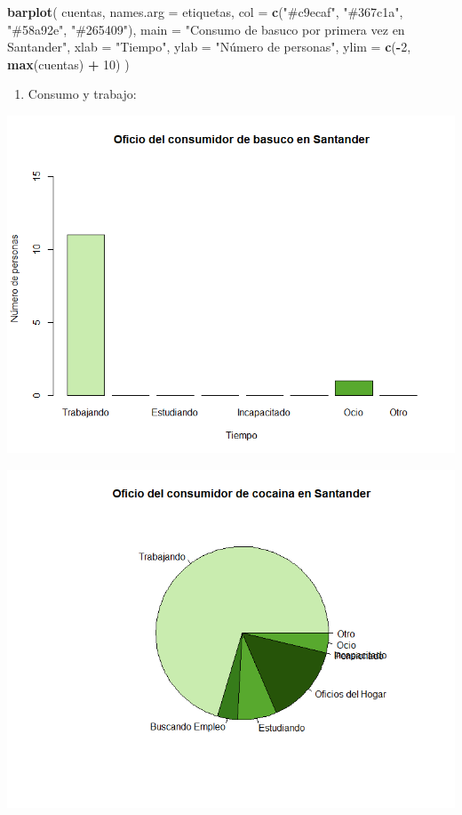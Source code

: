 \documentclass[
]{article}
\newenvironment{Shaded}{\begin{snugshade}}{\end{snugshade}}
\newcommand{\AttributeTok}[1]{\textcolor[rgb]{0.13,0.29,0.53}{#1}}
\newcommand{\DecValTok}[1]{\textcolor[rgb]{0.00,0.00,0.81}{#1}}
\newcommand{\FunctionTok}[1]{\textcolor[rgb]{0.13,0.29,0.53}{\textbf{#1}}}
\newcommand{\NormalTok}[1]{#1}
\newcommand{\SpecialCharTok}[1]{\textcolor[rgb]{0.81,0.36,0.00}{\textbf{#1}}}
\newcommand{\StringTok}[1]{\textcolor[rgb]{0.31,0.60,0.02}{#1}}
\providecommand{\tightlist}{%
  \setlength{\itemsep}{0pt}\setlength{\parskip}{0pt}}
\begin{document}
\begin{Shaded}
\begin{Highlighting}[]
\FunctionTok{barplot}\NormalTok{(}
\NormalTok{  cuentas,}
  \AttributeTok{names.arg =}\NormalTok{ etiquetas,}
  \AttributeTok{col =} \FunctionTok{c}\NormalTok{(}\StringTok{"\#c9ecaf"}\NormalTok{, }\StringTok{"\#367c1a"}\NormalTok{, }\StringTok{"\#58a92e"}\NormalTok{, }\StringTok{"\#265409"}\NormalTok{),}
  \AttributeTok{main =} \StringTok{"Consumo de basuco por primera vez en Santander"}\NormalTok{,}
  \AttributeTok{xlab =} \StringTok{"Tiempo"}\NormalTok{,}
  \AttributeTok{ylab =} \StringTok{"Número de personas"}\NormalTok{,}
  \AttributeTok{ylim =} \FunctionTok{c}\NormalTok{(}\SpecialCharTok{{-}}\DecValTok{2}\NormalTok{, }\FunctionTok{max}\NormalTok{(cuentas) }\SpecialCharTok{+} \DecValTok{10}\NormalTok{)}
\NormalTok{)}
\end{Highlighting}
\end{Shaded}

\begin{enumerate}
\def\labelenumi{\arabic{enumi}.}
\setcounter{enumi}{1}
\tightlist
\item
  Consumo y trabajo:
\end{enumerate}

\includegraphics{images/Basuco oficio Santander.png}

\includegraphics{images/cocaina oficio santander.png}
\end{document}
